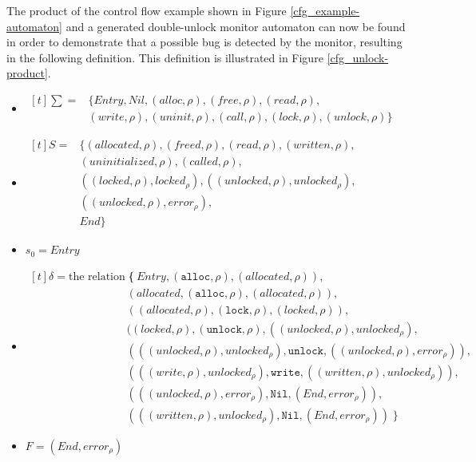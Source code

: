 \newpar The product of the control flow example shown in Figure \ref{cfg_example-automaton} and a generated double-unlock monitor automaton can now be found in order to demonstrate that a possible bug is detected by the monitor, resulting in the following definition. This definition is illustrated in Figure \ref{cfg_unlock-product}. 

\begin{itemize}
    \item{
        $
            \begin{aligned}[t] 
                \sum = & \{\mathit{Entry}, \mathit{Nil}, (alloc, \rho), (free, \rho), (read, \rho), \\ 
                & (write, \rho), (uninit, \rho), (call, \rho), (lock, \rho), (unlock, \rho)\}
            \end{aligned} 
        $
    }
    \item{
        $
            \begin{aligned}[t]
                S = & \{(allocated, \rho), (freed, \rho), (read, \rho), (written, \rho),\\ 
                & (uninitialized, \rho), (called, \rho), \\
                & ((locked, \rho), locked_\rho), ((unlocked, \rho), unlocked_\rho), \\
                & ((unlocked, \rho), error_\rho), \\
                & End\}
            \end{aligned}
        $
    }
    \item $s_0 = Entry$ 
    \item {
        $
            \begin{aligned}[t]
            \delta = \text{the relation} \; \{ \; & (Entry, (\texttt{alloc},\rho), (allocated, \rho)), \\ 
            & (allocated, (\texttt{alloc},\rho), (allocated, \rho)), \\ 
            & ((allocated, \rho), (\texttt{lock}, \rho), (locked, \rho)), \\
            & ((locked, \rho), (\texttt{unlock}, \rho), ((unlocked, \rho), unlocked_\rho), \\
            & (((unlocked, \rho), unlocked_\rho), \texttt{unlock}, ((unlocked, \rho), error_\rho)), \\ 
            & (((write, \rho), unlocked_\rho), \texttt{write}, ((written, \rho), unlocked_\rho)), \\ 
            & (((unlocked, \rho), error_\rho), \texttt{Nil}, (End, error_\rho)), \\ 
            & (((written, \rho), unlocked_\rho), \texttt{Nil}, (End, error_\rho)) \; \}
            \end{aligned}
        $ 
    }
    \item $F = (End, error_\rho)$  
\end{itemize}

